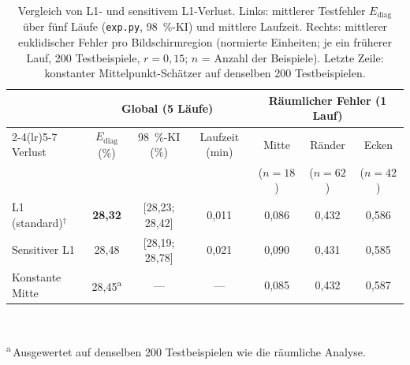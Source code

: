 \documentclass[
  11pt,
  a4paper,
  oneside,
  DIV=12,
  BCOR=8mm,
  parskip=half,
  headings=normal,
  bibliography=totoc,
  listof=totoc
]{scrreprt}
\newcommand{\code}[1]{\texttt{#1}}
\newcommand{\Ediag}{E_{\mathrm{diag}}}
\newcommand{\sel}{\ensuremath{^{\dagger}}}
\begin{document}
\begin{table}[htbp]
  \centering
  \caption{Vergleich von L1- und sensitivem L1-Verlust. Links: mittlerer
           Testfehler $\Ediag$ über fünf Läufe (\code{exp.py},
           \SI{98}{\percent}-KI) und mittlere Laufzeit. Rechts: mittlerer
           euklidischer Fehler pro Bildschirmregion (normierte Einheiten; je
           ein früherer Lauf, 200 Testbeispiele, $r=0,15$; $n$ = Anzahl der
           Beispiele). Letzte Zeile: konstanter Mittelpunkt-Schätzer auf
           denselben 200 Testbeispielen.}
  \label{tab:loss}
  \small
  \setlength{\tabcolsep}{4.5pt}
  \begin{tabular}{lccc@{\hspace{1.2em}}ccc}
    \toprule
    & \multicolumn{3}{c}{Global (5 Läufe)} & \multicolumn{3}{c}{Räumlicher Fehler (1 Lauf)} \\
    \cmidrule(lr){2-4}\cmidrule(lr){5-7}
    Verlust & $\Ediag$ (\%) & \SI{98}{\percent}-KI (\%) & Laufzeit (min)
            & Mitte & Ränder & Ecken \\
            &               &                           &
            & ($n=18$) & ($n=62$) & ($n=42$) \\
    \midrule
    L1 (standard)\sel{}    & \textbf{28,32} & [28,23; 28,42] & 0,011 & 0,086 & 0,432 & 0,586 \\
    Sensitiver L1          & 28,48 & [28,19; 28,78] & 0,021 & 0,090 & 0,431 & 0,585 \\
    \midrule
    Konstante Mitte        & 28,45\textsuperscript{a} & --- & --- & 0,085 & 0,432 & 0,587 \\
    \bottomrule
  \end{tabular}\\[1mm]
  \parbox{0.95\linewidth}{\footnotesize \textsuperscript{a}\,Ausgewertet auf
  denselben 200 Testbeispielen wie die räumliche Analyse.}
\end{table}
\end{document}

